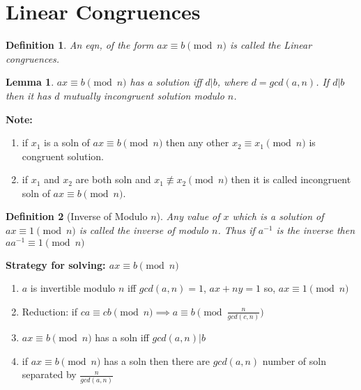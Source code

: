 \documentclass[12pt,a4paper]{article}
\newtheorem{defn}{Definition}
\newtheorem{lem}{Lemma}
\begin{document}
\section{Linear Congruences}
\begin{defn}\normalfont
	An eqn, of the form $ax\equiv b \pmod n$ is called the Linear congruences.
\end{defn}
\begin{lem}\normalfont
	$ax \equiv b \pmod n$ has a solution iff $d|b$, where $d=gcd(a,n)$. If $d|b$ then it has $d$ mutually incongruent solution modulo $n$.
\end{lem}
\textbf{Note: }
\begin{enumerate}
	\item if $x_{1}$ is a soln of $ax \equiv b \pmod n$ then any other $x_{2} \equiv x_{1}  \pmod n$ is congruent solution.
	\item if $x_{1}$ and $x_{2}$ are both soln and  $x_{1} \not \equiv x_{2}  \pmod n$ then it is called incongruent soln of $ax \equiv b \pmod n$.
\end{enumerate}

\begin{defn}[Inverse of Modulo $n$]\normalfont
Any value of $x$ which is a solution of $ax \equiv 1 \pmod n$ is called the inverse of modulo $n$. Thus if $a^{-1}$ is the inverse then $aa^{-1} \equiv 1 \pmod n$
\end{defn}

\textbf{Strategy for solving: $ax \equiv b \pmod n$}
\begin{enumerate}
	\item $a$ is invertible modulo $n$ iff $gcd(a,n)=1$, $ax+ny=1$ so, $ax\equiv 1 \pmod n$
	\item Reduction: if $ca\equiv cb \pmod n \implies a \equiv b \pmod {\frac{n}{gcd(c,n)}}$
	\item $ax \equiv b \pmod n$ has a soln iff $gcd(a,n)|b$
	\item if $ax \equiv b \pmod n$ has a soln then there are $gcd(a,n)$ number of soln separated by $\frac{n}{gcd(a,n)}$
\end{enumerate}
\end{document}
